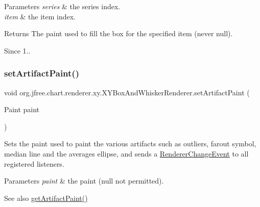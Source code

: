 \begin{DoxyParams}{Parameters}
{\em series} & the series index. \\
\hline
{\em item} & the item index.\\
\hline
\end{DoxyParams}
\begin{DoxyReturn}{Returns}
The paint used to fill the box for the specified item (never {\ttfamily null}).
\end{DoxyReturn}
\begin{DoxySince}{Since}
1.. 
\end{DoxySince}
\mbox{\label{classorg_1_1jfree_1_1chart_1_1renderer_1_1xy_1_1_x_y_box_and_whisker_renderer_ae91dcdaf8a2b50953c0b13c4ee59b011}} 
\subsubsection{\texorpdfstring{set\+Artifact\+Paint()}{setArtifactPaint()}}
{\footnotesize\ttfamily void org.\+jfree.\+chart.\+renderer.\+xy.\+X\+Y\+Box\+And\+Whisker\+Renderer.\+set\+Artifact\+Paint (\begin{DoxyParamCaption}\item[{Paint}]{paint }\end{DoxyParamCaption})}

Sets the paint used to paint the various artifacts such as outliers, farout symbol, median line and the averages ellipse, and sends a \mbox{\hyperlink{}{Renderer\+Change\+Event}} to all registered listeners.


\begin{DoxyParams}{Parameters}
{\em paint} & the paint ({\ttfamily null} not permitted).\\
\hline
\end{DoxyParams}
\begin{DoxySeeAlso}{See also}
\mbox{\hyperlink{classorg_1_1jfree_1_1chart_1_1renderer_1_1xy_1_1_x_y_box_and_whisker_renderer_ae755a075361086f61d3d1f8ac7f2d652}{get\+Artifact\+Paint()}} 
\end{DoxySeeAlso}
\mbox{\label{classorg_1_1jfree_1_1chart_1_1renderer_1_1xy_1_1_x_y_box_and_whisker_renderer_a355259830b67806e031b3cda109cbbf9}} 
